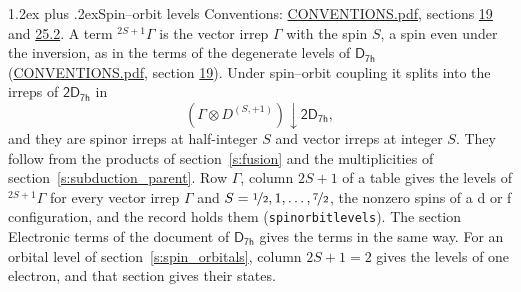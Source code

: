 \documentclass[10pt,a4paper]{article}
\makeatletter
\renewcommand\section{\@startsection{section}{1}{\z@}{-3ex plus -1ex minus -.2ex}%
  {1.2ex plus .2ex}{\normalfont\large\sffamily\bfseries\color{parttitle}}}
\numberwithin{equation}{section}
\newcommand{\grp}[1]{\mathsf{#1}}
\newcommand{\restr}[2]{#1\!\downarrow#2}
\newcommand{\irrJp}[2]{D^{(#1,#2)}}
\newcommand{\irrprod}{\otimes}
\newcommand{\term}[2]{{}^{#1}#2}
\makeatother
\begin{document}
\section{Spin--orbit levels}\label{s:spin_orbit}
Conventions: \href{../../CONVENTIONS.pdf}{CONVENTIONS.pdf}, sections \href{../../../rotation/CONVENTIONS.pdf\#conv.19}{19} and \href{../../CONVENTIONS.pdf\#conv.25.2}{25.2}.
\leavevmode\label{n:local.spin}\label{n:symbol.term}A term $\term{2S+1}{\Gamma}$ is the vector irrep $\Gamma$ with the spin $S$, a spin even under the inversion, as in the terms of the degenerate levels of \href{../../../rotation/data/pdf/D7h.pdf}{$\grp{D_{7h}}$} (\href{../../CONVENTIONS.pdf}{CONVENTIONS.pdf}, section \href{../../../rotation/CONVENTIONS.pdf\#conv.19}{19}). Under spin--orbit coupling it splits into the irreps of $\grp{2D_{7h}}$ in
\begin{equation}\label{e:spinorbit}\restr{(\Gamma \irrprod \irrJp{S}{+1})}{\grp{2D_{7h}}},\end{equation}
and they are spinor irreps at half-integer $S$ and vector irreps at integer $S$. They follow from the products of section~\ref{s:fusion} and the multiplicities of section~\ref{s:subduction_parent}. Row $\Gamma$, column $2S + 1$ of a table gives the levels of $\term{2S+1}{\Gamma}$ for every vector irrep $\Gamma$ and $S = \nicefrac{1}{2}, 1, \dots, \nicefrac{7}{2}$, the nonzero spins of a d or f configuration, and the record holds them (\texttt{spinorbitlevels}). The section Electronic terms of the document of \href{../../../rotation/data/pdf/D7h.pdf}{$\grp{D_{7h}}$} gives the terms in the same way. For an orbital level of section~\ref{s:spin_orbitals}, column $2S + 1 = 2$ gives the levels of one electron, and that section gives their states.
\end{document}
